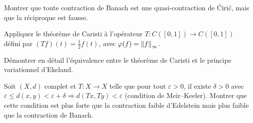 \begin{exercice}
Montrer que toute contraction de Banach est une quasi-contraction de \'Ciri\'c,
mais que la r\'eciproque est fausse.
\end{exercice}

\begin{exercice}
Appliquer le th\'eor\`eme de Caristi \`a l'op\'erateur $T : C([0,1]) \to C([0,1])$
d\'efini par $(Tf)(t) = \frac{1}{2} f(t)$, avec $\varphi(f) = \left\| f \right\|_\infty$.
\end{exercice}

\begin{exercice}
D\'emontrer en d\'etail l'\'equivalence entre le th\'eor\`eme de Caristi et le
principe variationnel d'Ekeland.
\end{exercice}

\begin{exercice}
Soit $(X, d)$ complet et $T : X \to X$ telle que pour tout $\varepsilon > 0$,
il existe $\delta > 0$ avec $\varepsilon \leq d(x,y) < \varepsilon + \delta
\Rightarrow d(Tx, Ty) < \varepsilon$ (condition de Meir--Keeler). Montrer que
cette condition est plus forte que la contraction faible d'Edelstein mais plus
faible que la contraction de Banach.
\end{exercice}
